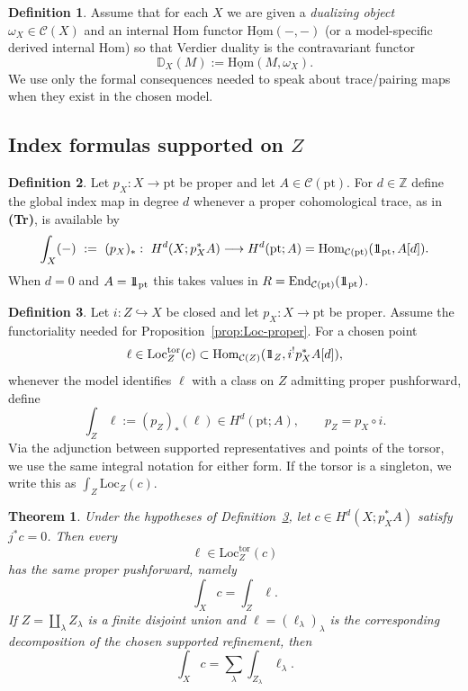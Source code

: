 \documentclass[10pt,a4paper,dvipsnames,x11names]{amsart}
\newcommand{\one}{1\hskip-3.5pt1}
\newcommand{\C}{\mathcal C}
\newcommand{\pt}{\mathrm{pt}}
\newcommand{\Hom}{\mathrm{Hom}}
\newcommand{\End}{\mathrm{End}}
\newcommand{\Loc}{\mathrm{Loc}}
\newcommand{\D}{\mathbb D}
\numberwithin{equation}{section}
\theoremstyle{plain}
\newtheorem{theorem}{Theorem}[section]
\theoremstyle{definition}
\newtheorem{definition}[definition]{Definition}
\theoremstyle{remark}
\begin{document}
\begin{definition} \label{def:duality}
Assume that for each $X$ we are given a \emph{dualizing object} $\omega_X\in\C(X)$ and an internal Hom functor
$\underline{\Hom}(-,-)$ (or a model-specific derived internal Hom) so that Verdier duality is the contravariant functor
$$
\D_X(M):=\underline{\Hom}(M,\omega_X).
$$
We use only the formal consequences needed to speak about trace/pairing maps when they exist in the chosen model.
\end{definition}

\subsection{Index formulas supported on \texorpdfstring{$Z$}{Z}}

\begin{definition} \label{def:global-index}
Let $p_X:X\to \pt$ be proper and let $A\in\C(\pt)$.
For $d\in\mathbb Z$ define the global index map in degree $d$ whenever a proper cohomological trace, as in \textbf{(Tr)}, is available
by
$$
\int_X(-)\ :=\ (p_X)_*:\ H^d(X;p_X^*A)\longrightarrow H^d(\pt;A)=\Hom_{\C(\pt)}(\one_\pt,A[d]).
$$
When $d=0$ and $A=\one_\pt$ this takes values in $R=\End_{\C(\pt)}(\one_\pt)$.
\end{definition}

\begin{definition}\label{def:local-index}
Let $i:Z\hookrightarrow X$ be closed and let $p_X:X\to\pt$ be proper.  Assume the functoriality needed for Proposition~\ref{prop:Loc-proper}.  For a chosen point
\[
\ell\in\Loc_Z^{\mathrm{tor}}(c)\subset
\Hom_{\C(Z)}(\one_Z,i^!p_X^*A[d]),
\]
whenever the model identifies $\ell$ with a class on $Z$ admitting proper pushforward, define
\[
\int_Z\ell:=(p_Z)_*(\ell)\in H^d(\pt;A),
\qquad p_Z=p_X\circ i.
\]
Via the adjunction between supported representatives and points of the torsor, we use the same integral notation for either form. If the torsor is a singleton, we write this as $\int_Z\Loc_Z(c)$.
\end{definition}

\begin{theorem}\label{thm:global-local}
Under the hypotheses of Definition~\ref{def:local-index}, let $c\in H^d(X;p_X^*A)$ satisfy $j^*c=0$.  Then every
\[
\ell\in\Loc_Z^{\mathrm{tor}}(c)
\]
has the same proper pushforward, namely
\[
\int_Xc=\int_Z\ell.
\]
If $Z=\coprod_\lambda Z_\lambda$ is a finite disjoint union and $\ell=(\ell_\lambda)_\lambda$ is the corresponding decomposition of the chosen supported refinement, then
\[
\int_Xc=\sum_\lambda\int_{Z_\lambda}\ell_\lambda.
\]
\end{theorem}
\end{document}
